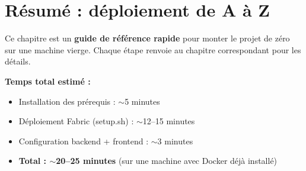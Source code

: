 \documentclass[12pt,a4paper,twoside]{report}
\begin{document}
\chapter{Résumé : déploiement de A à Z}

Ce chapitre est un \textbf{guide de référence rapide} pour monter le projet de zéro sur une machine vierge. Chaque étape renvoie au chapitre correspondant pour les détails.

\begin{infobox}
\textbf{Temps total estimé :}
\begin{itemize}
    \item Installation des prérequis : $\sim$5 minutes
    \item Déploiement Fabric (setup.sh) : $\sim$12--15 minutes
    \item Configuration backend + frontend : $\sim$3 minutes
    \item \textbf{Total : $\sim$20--25 minutes} (sur une machine avec Docker déjà installé)
\end{itemize}
\end{infobox}
\end{document}
